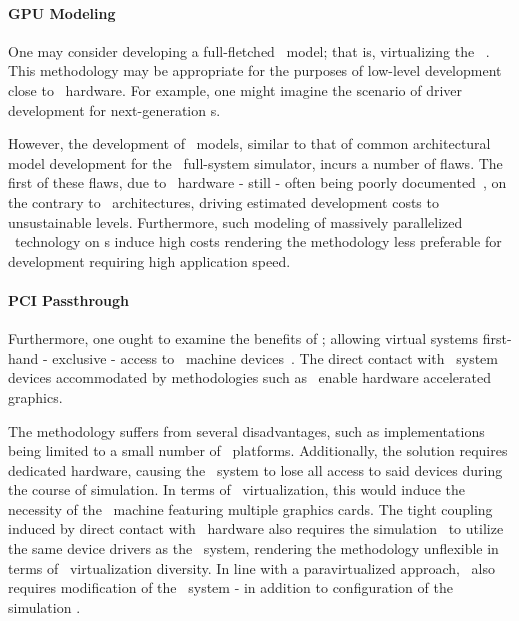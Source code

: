 
\paragraph{GPU Modeling}
\label{par:backgroundandrelatedwork_graphicsvirtualization_gpumodeling}
One may consider developing a full-fletched \dvttermgpu\ model; that is, virtualizing the \dvttermgpu\ \dvttermisa .
This methodology may be appropriate for the purposes of low-level development close to \dvttermgpu\ hardware.
For example, one might imagine the scenario of driver development for next-generation \dvttermgpu s.

However, the development of \dvttermgpu\ models, similar to that of common architectural model development for the \dvttermsimics\ full-system simulator, incurs a number of flaws.
The first of these flaws, due to \dvttermgpu\ hardware - still - often being poorly documented~, on the contrary to \dvttermcpu\ architectures, driving estimated development costs to unsustainable levels.
Furthermore, such modeling of massively parallelized \dvttermgpu\ technology on \dvttermcpu s induce high costs rendering the methodology less preferable for development requiring high application speed.

\paragraph{PCI Passthrough}
\label{par:backgroundandrelatedwork_graphicsvirtualization_pcipassthrough}
Furthermore, one ought to examine the benefits of \dvttermpcipassthrough ; allowing virtual systems first-hand - exclusive - access to \dvttermhost\ machine devices~.
The direct contact with \dvttermhost\ system devices accommodated by methodologies such as \dvttermpcipassthrough\ enable hardware accelerated graphics.

The methodology suffers from several disadvantages, such as implementations being limited to a small number of \dvttermlinux\ platforms.
Additionally, the solution requires dedicated hardware, causing the \dvttermhost\ system to lose all access to said devices during the course of simulation.
In terms of \dvttermgpu\ virtualization, this would induce the necessity of the \dvttermhost\ machine featuring multiple graphics cards.
The tight coupling induced by direct contact with \dvttermhost\ hardware also requires the simulation \dvttermtarget\ to utilize the same device drivers as the \dvttermhost\ system, rendering the methodology unflexible in terms of \dvttermgpu\ virtualization diversity.
In line with a paravirtualized approach, \dvttermpcipassthrough\ also requires modification of the \dvttermtarget\ system - in addition to configuration of the simulation \dvttermhost .

